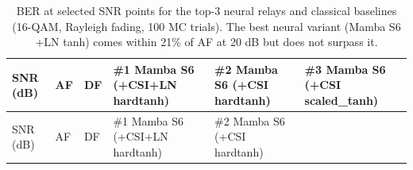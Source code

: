 \begin{longtable}[]{@{}
  >{\raggedright\arraybackslash}p{}
  >{\raggedright\arraybackslash}p{}
  >{\raggedright\arraybackslash}p{}
  >{\raggedright\arraybackslash}p{}
  >{\raggedright\arraybackslash}p{}
  >{\raggedright\arraybackslash}p{}@{}}
\caption{BER at selected SNR points for the top-3 neural relays and classical baselines (16-QAM, Rayleigh fading, 100 MC trials). The best neural variant (Mamba S6 +LN tanh) comes within 21\% of AF at 20 dB but does not surpass it.}\label{tbl:table19}\tabularnewline
\toprule\noalign{}
\begin{minipage}[b]{\linewidth}\raggedright
SNR (dB)
\end{minipage} & \begin{minipage}[b]{\linewidth}\raggedright
AF
\end{minipage} & \begin{minipage}[b]{\linewidth}\raggedright
DF
\end{minipage} & \begin{minipage}[b]{\linewidth}\raggedright
\#1 Mamba S6 (+CSI+LN hardtanh)
\end{minipage} & \begin{minipage}[b]{\linewidth}\raggedright
\#2 Mamba S6 (+CSI hardtanh)
\end{minipage} & \begin{minipage}[b]{\linewidth}\raggedright
\#3 Mamba S6 (+CSI scaled\_tanh)
\end{minipage} \\
\midrule\noalign{}
\endfirsthead
\toprule\noalign{}
\begin{minipage}[b]{\linewidth}\raggedright
SNR (dB)
\end{minipage} & \begin{minipage}[b]{\linewidth}\raggedright
AF
\end{minipage} & \begin{minipage}[b]{\linewidth}\raggedright
DF
\end{minipage} & \begin{minipage}[b]{\linewidth}\raggedright
\#1 Mamba S6 (+CSI+LN hardtanh)
\end{minipage} & \begin{minipage}[b]{\linewidth}\raggedright
\#2 Mamba S6 (+CSI hardtanh)

\end{minipage}
\end{longtable}
